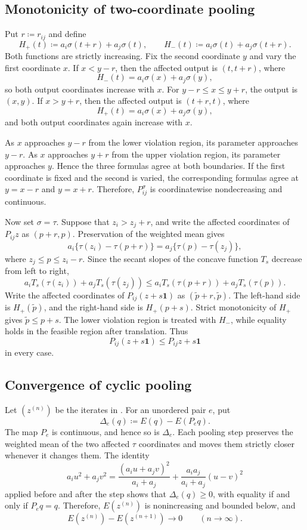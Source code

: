 \documentclass[10pt,a4paper]{amsart}
\begin{document}
\subsection{Monotonicity of two-coordinate pooling}
\label{subsec:app-pairwise-pooling}

Put $r\coloneqq r_{ij}$ and define
\[
H_+(t)\coloneqq a_i\sigma(t+r)+a_j\sigma(t),\qquad H_-(t)\coloneqq a_i\sigma(t)+a_j\sigma(t+r).
\]
Both functions are strictly increasing. Fix the second coordinate $y$ and vary the first coordinate $x$. If $x<y-r$, then the affected output is $(t,t+r)$, where
\[
H_-(t)=a_i\sigma(x)+a_j\sigma(y),
\]
so both output coordinates increase with $x$. For $y-r\leq x\leq y+r$, the output is $(x,y)$. If $x>y+r$, then the affected output is $(t+r,t)$, where
\[
H_+(t)=a_i\sigma(x)+a_j\sigma(y),
\]
and both output coordinates again increase with $x$.

As $x$ approaches $y-r$ from the lower violation region, its parameter approaches $y-r$. As $x$ approaches $y+r$ from the upper violation region, its parameter approaches $y$. Hence the three formulas agree at both boundaries. If the first coordinate is fixed and the second is varied, the corresponding formulas agree at $y=x-r$ and $y=x+r$. Therefore, $P_{ij}^\sigma$ is coordinatewise nondecreasing and continuous.

Now set $\sigma=\tau$. Suppose that $z_i>z_j+r$, and write the affected coordinates of $P_{ij}z$ as $(p+r,p)$. Preservation of the weighted mean gives
\[
a_i\{\tau(z_i)-\tau(p+r)\}=a_j\{\tau(p)-\tau(z_j)\},
\]
where $z_j\leq p\leq z_i-r$. Since the secant slopes of the concave function $T_s$ decrease from left to right,
\[
a_iT_s(\tau(z_i))+a_jT_s(\tau(z_j))\leq a_iT_s(\tau(p+r))+a_jT_s(\tau(p)).
\]
Write the affected coordinates of $P_{ij}(z+s\boldsymbol1)$ as $(\widetilde p+r,\widetilde p)$. The left-hand side is $H_+(\widetilde p)$, and the right-hand side is $H_+(p+s)$. Strict monotonicity of $H_+$ gives $\widetilde p\leq p+s$. The lower violation region is treated with $H_-$, while equality holds in the feasible region after translation. Thus
\[
P_{ij}(z+s\boldsymbol1)\leq P_{ij}z+s\boldsymbol1
\]
in every case.

\subsection{Convergence of cyclic pooling}
\label{subsec:app-pooling-convergence}

Let $(z^{(n)})$ be the iterates in . For an unordered pair $e$, put
\[
\Delta_e(q)\coloneqq E(q)-E(P_eq).
\]
The map $P_e$ is continuous, and hence so is $\Delta_e$. Each pooling step preserves the weighted mean of the two affected $\tau$ coordinates and moves them strictly closer whenever it changes them. The identity
\[
a_i u^2+a_jv^2=\frac{(a_i u+a_jv)^2}{a_i+a_j}+\frac{a_ia_j}{a_i+a_j}(u-v)^2
\]
applied before and after the step shows that $\Delta_e(q)\geq0$, with equality if and only if $P_eq=q$. Therefore, $E(z^{(n)})$ is nonincreasing and bounded below, and
\[
E(z^{(n)})-E(z^{(n+1)})\longrightarrow0\qquad(n\to\infty).
\]
\end{document}
